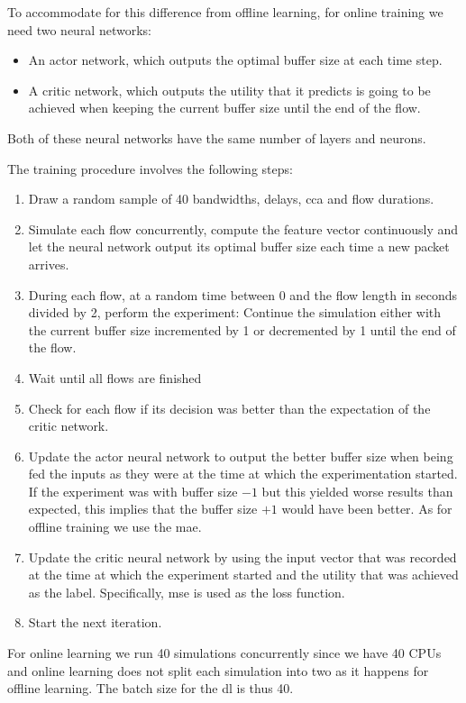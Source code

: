 \documentclass[conference]{IEEEtran}
\begin{document}
To accommodate for this difference from offline learning, for online training we need two neural networks: 
\begin{itemize}
\item An actor network, which outputs the optimal buffer size at each time step.
\item A critic network, which outputs the utility that it predicts is going to be achieved when keeping the current buffer size until the end of the flow. 
\end{itemize}
Both of these neural networks have the same number of layers and neurons. 

The training procedure involves the following steps:
\begin{enumerate}
\item Draw a random sample of 40 bandwidths, delays, \gls{cca} and flow durations.
\item Simulate each flow concurrently, compute the feature vector continuously and let the neural network output its optimal buffer size each time a new packet arrives. 
\item During each flow, at a random time between 0 and the flow length in seconds divided by 2, perform the experiment: Continue the simulation either with the current buffer size incremented by 1 or decremented by 1 until the end of the flow.
\item Wait until all flows are finished
\item Check for each flow if its decision was better than the expectation of the critic network.
\item Update the actor neural network to output the better buffer size when being fed the inputs as they were at the time at which the experimentation started. If the experiment was with buffer size $-1$ but this yielded worse results than expected, this implies that the buffer size $+1$ would have been better. As for offline training we use the \gls{mae}. 
\item Update the critic neural network by using the input vector that was recorded at the time at which the experiment started and the utility that was achieved as the label. Specifically, \gls{mse} is used as the loss function. 
\item Start the next iteration. 
\end{enumerate}

For online learning we run 40 simulations concurrently since we have 40 CPUs and online learning does not split each simulation into two as it happens for offline learning. The batch size for the \gls{dl} is thus 40. 
\end{document}
